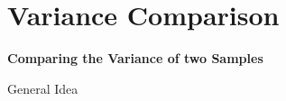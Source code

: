 \section{Variance Comparison}

\begin{frame}{}

  \begin{center}
    {\large {\bf
        Comparing the Variance of two Samples
    }}
  \end{center}
  
\end{frame}

\begin{frame}{General Idea}
\end{frame}